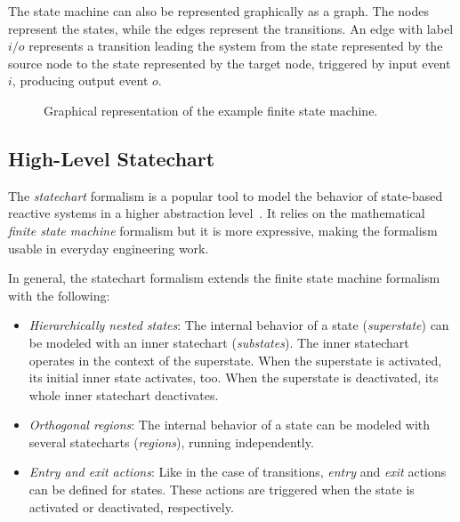 \begin{example}
    The state machine can also be represented graphically as a graph. The nodes represent the states, while the edges represent the transitions. An edge with label $i / o$ represents a transition leading the system from the state represented by the source node to the state represented by the target node, triggered by input event $i$, producing output event $o$.

    \begin{figure}[htbp]
    \centering
    
    \caption{Graphical representation of the example finite state machine.}
    \label{fig:fsm}
    \end{figure}
    
\end{example}

\subsection{High-Level Statechart}\label{ssec:statechart}

The \textit{statechart} formalism is a popular tool to model the behavior of state-based reactive systems in a higher abstraction level~\cite{Harel}. It relies on the mathematical \textit{finite state machine} formalism but it is more expressive, making the formalism usable in everyday engineering work.

In general, the statechart formalism extends the finite state machine formalism with the following:
\begin{itemize}
    \item \textit{Hierarchically nested states}: The internal behavior of a state (\textit{superstate}) can be modeled with an inner statechart (\textit{substates}). The inner statechart operates in the context of the superstate. When the superstate is activated, its initial inner state activates, too. When the superstate is deactivated, its whole inner statechart deactivates.
    \item \textit{Orthogonal regions}: The internal behavior of a state can be modeled with several statecharts (\textit{regions}), running independently.
    \item \textit{Entry and exit actions}: Like in the case of transitions, \textit{entry} and \textit{exit} actions can be defined for states. These actions are triggered when the state is activated or deactivated, respectively.
\end{itemize}

